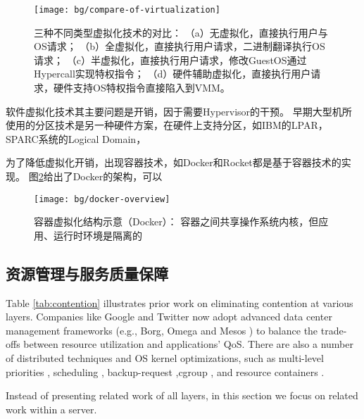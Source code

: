 \begin{figure}[t]
  \centering
  \texttt{[image: bg/compare-of-virtualization]}
  \caption[三种不同类型虚拟化技术的对比]{三种不同类型虚拟化技术的对比：
    （a）无虚拟化，直接执行用户与OS请求；
    （b）全虚拟化，直接执行用户请求，二进制翻译执行OS请求；
    （c）半虚拟化，直接执行用户请求，修改GuestOS通过Hypercall实现特权指令；
    （d）硬件辅助虚拟化，直接执行用户请求，硬件支持OS特权指令直接陷入到VMM。}
  \label{fig:compare-of-virt}
\end{figure}

软件虚拟化技术其主要问题是开销，因于需要Hypervisor的干预。
早期大型机所使用的分区技术是另一种硬件方案，在硬件上支持分区，如IBM的LPAR\cite{}，
SPARC系统的Logical Domain\cite{}，

为了降低虚拟化开销，出现容器技术，如Docker\cite{}和Rocket\cite{}都是基于容器技术的实现。
图\ref{fig:docker-overview}给出了Docker的架构，可以

\begin{figure}[H]
  \centering
  \texttt{[image: bg/docker-overview]}
  \caption[容器虚拟化结构示意（Docker）]{容器虚拟化结构示意（Docker）：
    容器之间共享操作系统内核，但应用、运行时环境是隔离的}
  \label{fig:docker-overview}
\end{figure}



\subsection{资源管理与服务质量保障}

Table \ref{tab:contention} illustrates prior work on eliminating contention at various layers.
Companies like Google and Twitter now adopt advanced data center management frameworks
(e.g., Borg\cite{borg:2015}, Omega \cite{Schwarzkopf_omega_2013}
and Mesos \cite{Hindman:2011:Mesos}) to balance the trade-offs between
resource utilization and applications' QoS.
There are also a number of distributed techniques and OS kernel
optimizations, such as multi-level priorities \cite{google_trace},
scheduling \cite{delimitrou_paragon:_2013, delimitrou_quasar:_2014,  mars_heterogeneity_2011,
kozyrakis_reconciling_2014, Novakovi:ATC2013}, backup-request \cite{dean_tail_2013},cgroup \cite{cgroup},
and resource containers \cite{lxc}.

Instead of presenting related work of all layers, in this section we focus on related work within a server.

